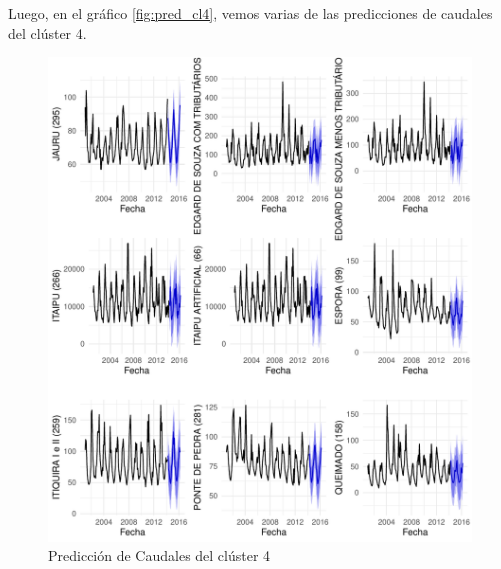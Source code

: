 \documentclass[12pt,oneside]{book}\usepackage[]{graphicx}\usepackage[]{color}
\makeatletter
\def\maxwidth{ %
  \ifdim\Gin@nat@width>\linewidth
    \linewidth
  \else
    \Gin@nat@width
  \fi
}
\newenvironment{knitrout}{}{} %
\theoremstyle{definition} %
\makeatother
\begin{document}
Luego, en el gráfico \ref{fig:pred_cl4}, vemos varias de las predicciones de caudales del clúster 4.

\begin{knitrout}
\color{fgcolor}\begin{figure}[h]

{\centering \includegraphics[width=\maxwidth]{figure/unnamed-chunk-95-1} 

}

\caption{\label{fig:pred_cl4} Predicción de Caudales del clúster 4}\label{fig:unnamed-chunk-95}
\end{figure}


\end{knitrout}


















\end{document}
